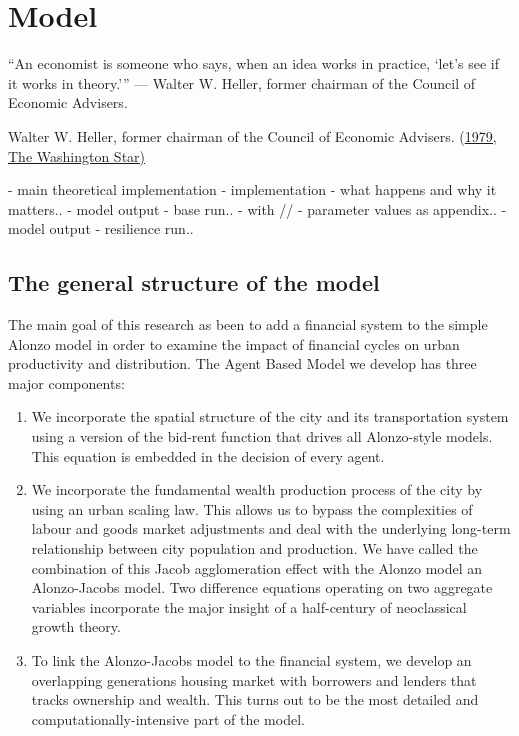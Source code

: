 \chapter{Model} \label{chapter-model}
\epigraph{“An economist is someone who says, when an idea works in practice, ‘let’s see if it works in theory.'”
— Walter W. Heller, former chairman of the Council of Economic Advisers.}{ Walter W. Heller, former chairman of the Council of Economic Advisers. (\href{https://quoteinvestigator.com/2015/08/30/practice/}{1979, The Washington Star)}}


- main theoretical implementation
- implementation - what happens and why it matters..
- model output - base run.. - with // 
- parameter values as appendix..
- model output - resilience run..


\section{The general structure of the model}
The main goal of this research as been to add a financial system to the  simple Alonzo model in  order to examine the impact of financial cycles on urban productivity and distribution. The Agent Based Model we develop has three major components: 

\begin{enumerate}
\item We incorporate the spatial structure of the city and its transportation system using a version of the bid-rent function that drives all Alonzo-style models. This equation is embedded in the decision of every agent.

\item We incorporate the fundamental wealth production process of the city by using an urban scaling law. This allows us to bypass the complexities of labour and goods market adjustments and deal with the underlying long-term relationship between city  population and production. We have called the combination of this Jacob agglomeration effect with the Alonzo model an Alonzo-Jacobs model.  Two difference equations operating  on two aggregate variables incorporate the major insight of a half-century of neoclassical growth theory.

\item To link the Alonzo-Jacobs model to the financial system, we develop an overlapping generations housing market with borrowers and lenders that tracks ownership and wealth. This turns out to be the most detailed and computationally-intensive part of the model.
\end{enumerate}

